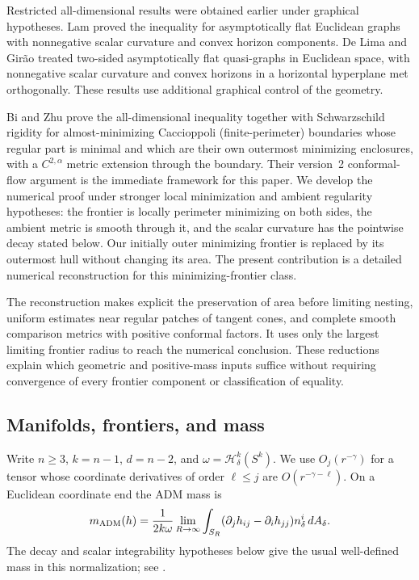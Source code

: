 Restricted all-dimensional results were obtained earlier under
graphical hypotheses. Lam \cite[Corollary~7]{Lam2010Graphs} proved the
inequality for asymptotically flat Euclidean graphs with nonnegative
scalar curvature and convex horizon components. De Lima and Gir\~ao
\cite[Theorem~1.8]{deLimaGirao2015} treated two-sided asymptotically flat
quasi-graphs in Euclidean space, with nonnegative scalar curvature and
convex horizons in a horizontal hyperplane met orthogonally. These
results use additional graphical control of the geometry.

Bi and Zhu \cite[Theorem~1.2]{BiZhu2026v2} prove the all-dimensional
inequality together with Schwarzschild rigidity for almost-minimizing
Caccioppoli (finite-perimeter) boundaries whose regular part is minimal
and which are
their own outermost minimizing enclosures, with a $C^{2,\alpha}$ metric
extension through the boundary. Their version~2 conformal-flow argument
is the immediate framework for this paper. We develop the numerical
proof under stronger local minimization and ambient regularity
hypotheses: the frontier is locally perimeter minimizing on both sides,
the ambient metric is smooth through it, and the scalar curvature has
the pointwise decay stated below. Our initially outer minimizing
frontier is replaced by its outermost hull without changing its area.
The present contribution is a detailed numerical reconstruction
for this minimizing-frontier class.

The reconstruction makes explicit the preservation of area before
limiting nesting, uniform estimates near regular patches of tangent
cones, and complete smooth comparison metrics with positive conformal
factors. It uses only the largest limiting frontier radius to reach
the numerical conclusion. These reductions explain which geometric
and positive-mass inputs suffice without requiring convergence of every
frontier component or classification of equality.

\subsection{Manifolds, frontiers, and mass}

Write $n\ge3$, $k=n-1$, $d=n-2$, and
$\omega=\mathcal H^k_\delta(S^k)$. We use $O_j(r^{-\gamma})$ for a
tensor whose coordinate derivatives of order $\ell\le j$ are
$O(r^{-\gamma-\ell})$. On a Euclidean coordinate end the ADM mass is
\[
 m_{\rm ADM}(h)=\frac1{2k\omega}
 \lim_{R\to\infty}\int_{S_R}
 (\partial_jh_{ij}-\partial_ih_{jj})n_\delta^i\,dA_\delta.
\]
The decay and scalar integrability hypotheses below give the usual
well-defined mass in this normalization; see \cite{Bartnik1986}.

